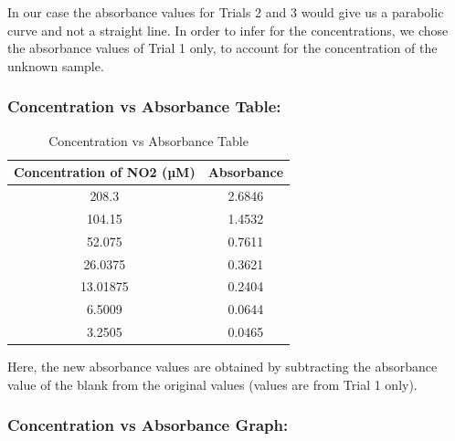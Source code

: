 \documentclass{report}
\begin{document}
In our case the absorbance values for Trials 2 and 3 would give us a parabolic curve and not a 
straight line. In order to infer for the concentrations, we chose the absorbance values of Trial 
1 only, to account for the concentration of the unknown sample.

 \vspace{1cm}

\subsubsection*{Concentration vs Absorbance Table:}
    \begin{table}[h]
      \centering
        \caption{Concentration vs Absorbance Table}
        \vspace{0.5cm}
        \label{tab:table3}
        
        \begin{tabular}{|c|c|}
          \hline
          \textbf{Concentration of NO2 (µM)} & \textbf{Absorbance} \\
          \hline
          208.3 &  2.6846 \\
          \hline
          104.15 & 1.4532  \\
          \hline
          52.075 & 0.7611 \\
          \hline
          26.0375 & 0.3621  \\
          \hline
          13.01875 & 0.2404  \\
          \hline
          6.5009 & 0.0644 \\
          \hline
          3.2505 & 0.0465 \\
          \hline
        \end{tabular}
      \end{table}
Here, the new absorbance values are obtained by subtracting the absorbance value of the 
blank from the original values (values are from Trial 1 only).

\subsubsection*{Concentration vs Absorbance Graph:}
\begin{center}



\end{center}
\end{document}
